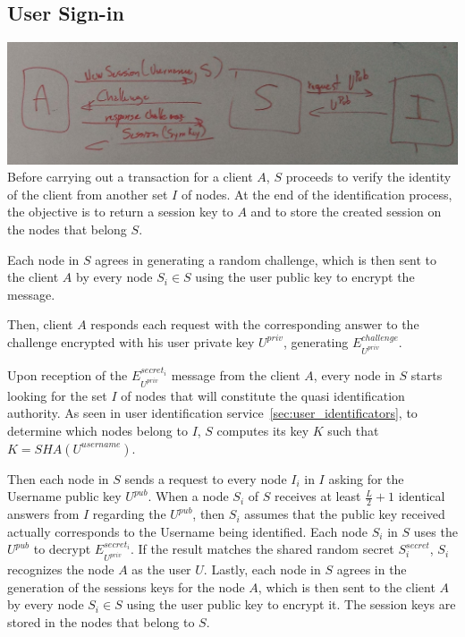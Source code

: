 \subsection{User Sign-in}
\includegraphics[width=14cm]{../img/session_creation_protocol_mockup}\\

Before carrying out a transaction for a client $A$, $S$ proceeds to
verify the identity of the client from another set $I$ of nodes. At the end of
the identification process, the objective is to return a session key to $A$
and to store the created session on the nodes that belong $S$.

Each node in $S$ agrees in generating a random challenge, which is then sent to the
client $A$ by every node $S_i \in S$ using the user public key to encrypt the
message.

Then, client $A$ responds each request with the corresponding answer to the
challenge encrypted with his user private key $U^{priv}$, generating
$E^{challenge}_{U^{priv}}$. 

Upon reception of the $E^{secret_i}_{U^{priv}}$ message from the client $A$, every node in $S$
starts looking for the set $I$ of nodes that will constitute the quasi
identification authority. As seen in user identification service~\ref{sec:user_identificators}, to
determine which nodes belong to $I$, $S$ computes
its key $K$ such that $K = SHA(U^{username})$.

Then each node in $S$ sends a request to every node $I_i$ in $I$ asking for the Username public key $U^{pub}$. When a node
$S_i$ of $S$ receives at least $\frac{L}{2} + 1$ identical answers from
$I$ regarding the $U^{pub}$, then $S_i$ assumes that the public key received
actually corresponds to the Username being identified. Each node $S_i$ in $S$
uses the $U^{pub}$ to decrypt $E^{secret_i}_{U^{priv}}$. If the result matches
the shared random secret $S^{secret}_i$, $S_i$ recognizes the node $A$ as the
user $U$.
Lastly, each node in $S$ agrees in the generation of the sessions keys for the
node $A$, which is then sent to the client $A$ by every node $S_i \in S$ using
the user public key to encrypt it. The session keys are stored in the
nodes that belong to $S$.

